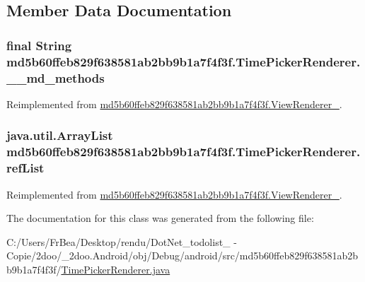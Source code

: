 \subsection{Member Data Documentation}
\hypertarget{classmd5b60ffeb829f638581ab2bb9b1a7f4f3f_1_1_time_picker_renderer_3c77da783a54f125d97047436f80a34c}{
\subsubsection[{\_\-\_\-md\_\-methods}]{\setlength{\rightskip}{0pt plus 5cm}final String {\bf md5b60ffeb829f638581ab2bb9b1a7f4f3f.TimePickerRenderer.\_\-\_\-md\_\-methods}}}
\label{classmd5b60ffeb829f638581ab2bb9b1a7f4f3f_1_1_time_picker_renderer_3c77da783a54f125d97047436f80a34c}




Reimplemented from \hyperlink{classmd5b60ffeb829f638581ab2bb9b1a7f4f3f_1_1_view_renderer__2_80b609e3e4054c380887d4dc2907a875}{md5b60ffeb829f638581ab2bb9b1a7f4f3f.ViewRenderer\_}.\hypertarget{classmd5b60ffeb829f638581ab2bb9b1a7f4f3f_1_1_time_picker_renderer_c8725b3e7813e45a02000d4b84812e6f}{
\subsubsection[{refList}]{\setlength{\rightskip}{0pt plus 5cm}java.util.ArrayList {\bf md5b60ffeb829f638581ab2bb9b1a7f4f3f.TimePickerRenderer.refList}}}
\label{classmd5b60ffeb829f638581ab2bb9b1a7f4f3f_1_1_time_picker_renderer_c8725b3e7813e45a02000d4b84812e6f}




Reimplemented from \hyperlink{classmd5b60ffeb829f638581ab2bb9b1a7f4f3f_1_1_view_renderer__2_6c151401977148a92c515e9c7de1aaf8}{md5b60ffeb829f638581ab2bb9b1a7f4f3f.ViewRenderer\_}.

The documentation for this class was generated from the following file:\begin{CompactItemize}
\item 
C:/Users/FrBea/Desktop/rendu/DotNet\_\-todolist\_ - Copie/2doo/\_\-2doo.Android/obj/Debug/android/src/md5b60ffeb829f638581ab2bb9b1a7f4f3f/\hyperlink{_time_picker_renderer_8java}{TimePickerRenderer.java}\end{CompactItemize}
